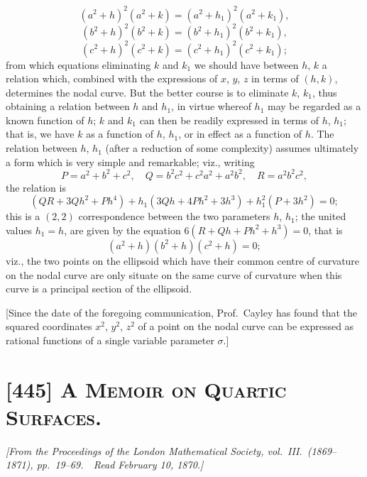 \documentclass[11pt,a4paper]{article}
\begin{document}
\[
(a^2 + h)^2 (a^2 + k) = (a^2 + h_1)^2 (a^2 + k_1),
\]
\[
(b^2 + h)^2 (b^2 + k) = (b^2 + h_1)^2 (b^2 + k_1),
\]
\[
(c^2 + h)^2 (c^2 + k) = (c^2 + h_1)^2 (c^2 + k_1);
\]
from which equations eliminating $k$ and $k_1$ we should have between $h$, $k$ a relation
which, combined with the expressions of $x$, $y$, $z$ in terms of $(h, k)$, determines the
nodal curve. But the better course is to eliminate $k$, $k_1$, thus obtaining a relation
between $h$ and $h_1$, in virtue whereof $h_1$ may be regarded as a known function of $h$;
$k$ and $k_1$ can then be readily expressed in terms of $h$, $h_1$; that is, we have $k$
as a function of $h$, $h_1$, or in effect as a function of $h$. The relation between $h$,
$h_1$ (after a reduction of some complexity) assumes ultimately a form which is very simple
and remarkable; viz., writing
\[
P = a^2 + b^2 + c^2,\quad Q = b^2 c^2 + c^2 a^2 + a^2 b^2,\quad R = a^2 b^2 c^2,
\]
the relation is
\[
(QR + 3 Q h^2 + P h^4)
+ h_1 (3 Q h + 4 P h^2 + 3 h^3)
+ h_1^2 (P + 3 h^2) = 0;
\]
this is a $(2, 2)$ correspondence between the two parameters $h$, $h_1$; the united values
$h_1 = h$, are given by the equation $6 (R + Q h + P h^2 + h^3) = 0$, that is
\[
(a^2 + h)(b^2 + h)(c^2 + h) = 0;
\]
viz., the two points on the ellipsoid which have their common centre of curvature on the
nodal curve are only situate on the same curve of curvature when this curve is a principal
section of the ellipsoid.

\medskip

[Since the date of the foregoing communication, Prof.\ Cayley has found that the squared
coordinates $x^2$, $y^2$, $z^2$ of a point on the nodal curve can be expressed as rational
functions of a single variable parameter $\sigma$.]

\bigskip

\section{[445] \textsc{A Memoir on Quartic Surfaces.}}

\begin{center}
\textit{[From the Proceedings of the London Mathematical Society, vol.\ III.\ (1869--1871),
pp.\ 19--69.\ \ Read February 10, 1870.]}
\end{center}
\end{document}
